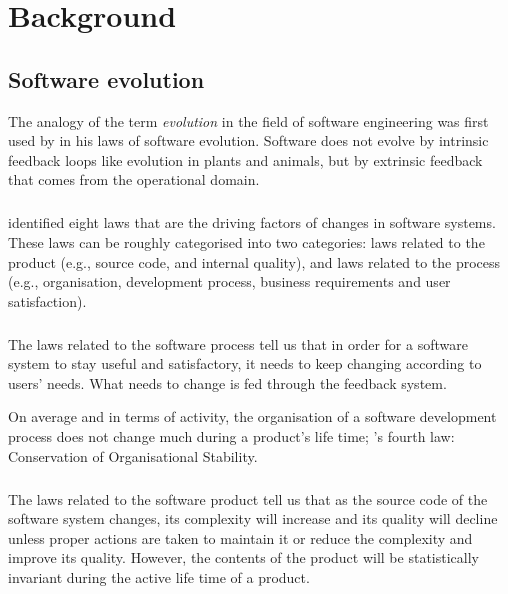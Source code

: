 \chapter{Background}
\label{background}

\section{Software evolution}
The analogy of the term \emph{evolution }\rm in the field of software
engineering was first used by \citet{lehman} in his laws of software evolution.
Software does not evolve by intrinsic feedback loops like evolution in plants
and animals, but by extrinsic feedback that comes from the operational domain.

\paragraph{}
\citeauthor{lehman} identified eight laws that are the driving factors of
changes in software systems. These laws can be roughly categorised into two
categories: laws related to the product (e.g., source code, and internal
quality), and laws related to the process (e.g., organisation, development
process, business requirements and user satisfaction).

\paragraph{}
The laws related to the software process tell us that in order for a software
system to stay useful and satisfactory, it needs to keep changing according to
users' needs. What needs to change is fed through the feedback system.

On average and in terms of activity, the organisation of a software development
process does not change much during a product's life time; \citeauthor{lehman}'s
fourth law: Conservation of Organisational Stability.

\paragraph{}
The laws related to the software product tell us that as the source code of the
software system changes, its complexity will increase and its quality will
decline unless proper actions are taken to maintain it or reduce the complexity
and improve its quality. However, the contents of the product will be
statistically invariant during the active life time of a product.

